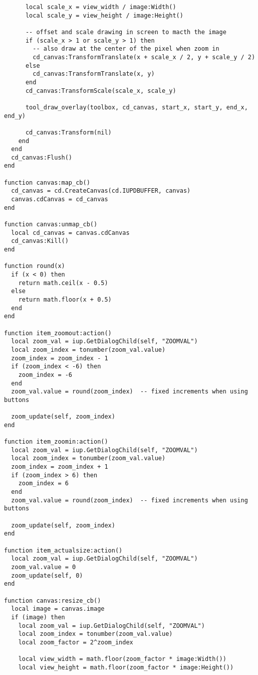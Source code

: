 \documentclass{ctexart}
\begin{document}
\begin{lstlisting}
      local scale_x = view_width / image:Width()
      local scale_y = view_height / image:Height()
      
      -- offset and scale drawing in screen to macth the image
      if (scale_x > 1 or scale_y > 1) then
        -- also draw at the center of the pixel when zoom in
        cd_canvas:TransformTranslate(x + scale_x / 2, y + scale_y / 2)
      else
        cd_canvas:TransformTranslate(x, y)
      end
      cd_canvas:TransformScale(scale_x, scale_y)

      tool_draw_overlay(toolbox, cd_canvas, start_x, start_y, end_x, end_y)
      
      cd_canvas:Transform(nil)
    end
  end
  cd_canvas:Flush()
end

function canvas:map_cb()
  cd_canvas = cd.CreateCanvas(cd.IUPDBUFFER, canvas)
  canvas.cdCanvas = cd_canvas
end

function canvas:unmap_cb()
  local cd_canvas = canvas.cdCanvas
  cd_canvas:Kill()
end

function round(x)
  if (x < 0) then
    return math.ceil(x - 0.5)
  else
    return math.floor(x + 0.5)
  end
end

function item_zoomout:action()
  local zoom_val = iup.GetDialogChild(self, "ZOOMVAL")
  local zoom_index = tonumber(zoom_val.value)
  zoom_index = zoom_index - 1
  if (zoom_index < -6) then
    zoom_index = -6
  end
  zoom_val.value = round(zoom_index)  -- fixed increments when using buttons 

  zoom_update(self, zoom_index)
end

function item_zoomin:action()
  local zoom_val = iup.GetDialogChild(self, "ZOOMVAL")
  local zoom_index = tonumber(zoom_val.value)
  zoom_index = zoom_index + 1
  if (zoom_index > 6) then
    zoom_index = 6
  end
  zoom_val.value = round(zoom_index)  -- fixed increments when using buttons 

  zoom_update(self, zoom_index)
end

function item_actualsize:action()
  local zoom_val = iup.GetDialogChild(self, "ZOOMVAL")
  zoom_val.value = 0
  zoom_update(self, 0)
end

function canvas:resize_cb()
  local image = canvas.image
  if (image) then
    local zoom_val = iup.GetDialogChild(self, "ZOOMVAL")
    local zoom_index = tonumber(zoom_val.value)
    local zoom_factor = 2^zoom_index

    local view_width = math.floor(zoom_factor * image:Width())
    local view_height = math.floor(zoom_factor * image:Height())


\end{lstlisting}
\end{document}
